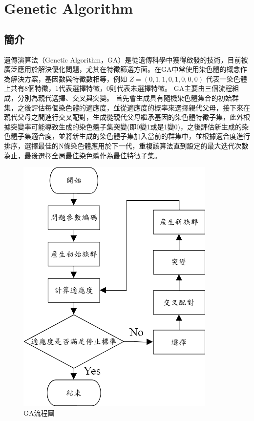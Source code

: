 \chapter{Genetic Algorithm}
\label{chapter:intro}
\section{簡介}
遺傳演算法（Genetic Algorithm，GA）是從遺傳科學中獲得啟發的技術，目前被廣泛應用於解決優化問題，尤其在特徵篩選方面。在GA中常使用染色體的概念作為解決方案，基因數與特徵數相等，例如 \(Z=(0,1,1,0,1,0,0,0)\) 代表一染色體上共有8個特徵，1代表選擇特徵，0則代表未選擇特徵。
GA主要由三個流程組成，分別為親代選擇、交叉與突變。
首先會生成具有隨機染色體集合的初始群集，之後評估每個染色體的適應度，並從適應度的概率來選擇親代父母，接下來在親代父母之間進行交叉配對，生成從親代父母繼承基因的染色體特徵子集，此外根據突變率可能導致生成的染色體子集突變(即0變1或是1變0)，之後評估新生成的染色體子集適合度，並將新生成的染色體子集加入當前的群集中，並根據適合度進行排序，選擇最佳的N條染色體應用於下一代，重複該算法直到設定的最大迭代次數為止，最後選擇全局最佳染色體作為最佳特徵子集。
\begin{figure}[H]
	\centerline{\includegraphics[scale=0.8]{./pic/pH9fWsxV.png}}
	\caption{GA流程圖}
	\label{fig:GAFlowChart}
\end{figure}

\label{sec:background}
